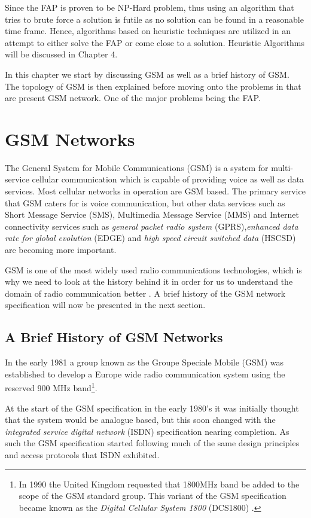 Since the FAP is proven to be NP-Hard problem, thus using an algorithm that tries to brute force a solution is futile as no solution can be found in a reasonable time frame. Hence, algorithms based on heuristic techniques are utilized in an attempt to either solve the FAP or come close to a solution. Heuristic Algorithms will be discussed in Chapter 4.

In this chapter we start by discussing GSM as well as a brief history of GSM. The topology of GSM is then explained before moving onto the problems in that are present GSM network. One of the major problems being the FAP.

\section{GSM Networks}
The General System for Mobile Communications (GSM) is a system for multi-service cellular communication which is capable of providing voice as well as data services. Most cellular networks in operation 
are GSM based. The primary service that GSM caters for is voice communication, but other data services such as Short Message Service (SMS), Multimedia Message Service (MMS) and Internet 
connectivity services such as \emph{general packet radio system} (GPRS),\emph{enhanced data rate for global evolution} (EDGE) and \emph{high speed circuit switched data} (HSCSD) are becoming more important\cite{GSMArchitectureProtocolsServices,Eisenblatter}.

GSM is one of the most widely used radio communications technologies, which is why we need to look at the history behind it in order for us to understand the domain of radio communication better \cite{GSMArchitectureProtocolsServices}. A brief history of the GSM network specification will now be presented in the next section.

\subsection{A Brief History of GSM Networks}
In the early 1981 a group known as the Groupe Speciale Mobile (GSM) was established to develop a Europe wide radio communication system using the reserved 900 MHz band\footnote{In 1990 the United Kingdom requested that 1800MHz band be added to the scope of the GSM standard group. This variant of the GSM specification became known as the \emph{Digital Cellular System 1800} (DCS1800) \cite{GSM92}.}.

At the start of the GSM specification in the early 1980's it was initially thought that the system would be analogue based, but this soon changed with the \emph{integrated service digital network} (ISDN) specification nearing completion. As such the GSM specification started following much of the same design principles and access protocols that ISDN exhibited.

